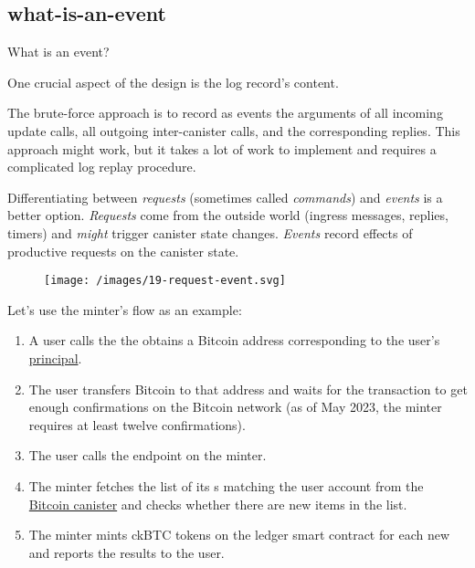 \documentclass{article}
\begin{document}
\subsection{what-is-an-event}{What is an event?}

One crucial aspect of the design is the log record's content.

The brute-force approach is to record as events the arguments of all incoming update calls, all outgoing inter-canister calls, and the corresponding replies.
This approach might work, but it takes a lot of work to implement and requires a complicated log replay procedure.

Differentiating between \emph{requests} (sometimes called \emph{commands}) and \emph{events} is a better option.
\emph{Requests} come from the outside world (ingress messages, replies, timers) and \emph{might} trigger canister state changes.
\emph{Events} record effects of productive requests on the canister state.

\begin{figure}[grayscale-diagram]
  \texttt{[image: /images/19-request-event.svg]}
\end{figure}

Let's use the minter's \href{https://sourcegraph.com/github.com/dfinity/ic@1cbf1f39d31bc426c1e15b073c4ac86d75056bb2/-/blob/rs/bitcoin/ckbtc/minter/ckbtc_minter.did?L253}{} flow as an example:

\begin{enumerate}
  \item
    A user calls the \href{https://sourcegraph.com/github.com/dfinity/ic@1cbf1f39d31bc426c1e15b073c4ac86d75056bb2/-/blob/rs/bitcoin/ckbtc/minter/ckbtc_minter.did?L246}{} the obtains a Bitcoin address corresponding to the user's \href{https://internetcomputer.org/docs/current/references/ic-interface-spec#principal}{principal}.
  \item
    The user transfers Bitcoin to that address and waits for the transaction to get enough confirmations on the Bitcoin network (as of May 2023, the minter requires at least twelve confirmations).
  \item
    The user calls the  endpoint on the minter.
  \item
    The minter fetches the list of its s matching the user account from the \href{https://github.com/dfinity/bitcoin-canister}{Bitcoin canister} and checks whether there are new items in the list.
  \item
    The minter mints ckBTC tokens on the ledger smart contract for each new  and reports the results to the user.
\end{enumerate}
\end{document}
